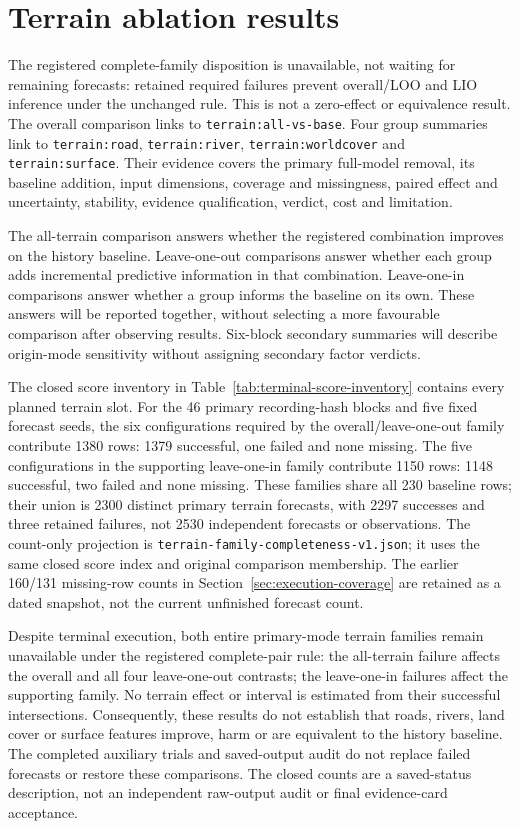 \section{Terrain ablation results}
\label{sec:terrain-results}\hypertarget{sec:terrain-results}{}
The registered complete-family disposition is unavailable, not waiting for
remaining forecasts: retained required failures prevent overall/LOO and LIO
inference under the unchanged rule. This is not a zero-effect or equivalence
result. The overall comparison links to \texttt{terrain:all-vs-base}.
Four group summaries link to \texttt{terrain:road}, \texttt{terrain:river},
\texttt{terrain:worldcover} and \texttt{terrain:surface}. Their evidence covers
the primary full-model removal, its baseline addition, input dimensions,
coverage and missingness, paired effect and uncertainty, stability, evidence
qualification, verdict, cost and limitation.

The all-terrain comparison answers whether the registered combination improves
on the history baseline. Leave-one-out comparisons answer whether each group
adds incremental predictive information in that combination. Leave-one-in
comparisons answer whether a group informs the baseline on its own. These
answers will be reported together, without selecting a more favourable
comparison after observing results. Six-block secondary summaries will
describe origin-mode sensitivity without assigning secondary factor verdicts.

The closed score inventory in Table~\ref{tab:terminal-score-inventory}
contains every planned terrain slot. For the 46 primary recording-hash
blocks and five fixed forecast seeds, the six configurations required by
the overall/leave-one-out family contribute 1380 rows: 1379 successful,
one failed and none missing. The five configurations in the supporting
leave-one-in family contribute 1150 rows: 1148 successful, two failed and
none missing. These families share all 230 baseline rows; their union is
2300 distinct primary terrain forecasts, with 2297 successes and three
retained failures, not 2530 independent forecasts or observations.
The count-only projection is \texttt{terrain-family-completeness-v1.json};
it uses the same closed score index and original comparison membership.
The earlier 160/131 missing-row counts in
Section~\ref{sec:execution-coverage} are retained as a dated snapshot,
not the current unfinished forecast count.

Despite terminal execution, both entire primary-mode terrain families
remain unavailable under the registered complete-pair rule: the
all-terrain failure affects the overall and all four leave-one-out
contrasts; the leave-one-in failures affect the supporting family.
No terrain effect or interval is estimated from their successful
intersections. Consequently, these results do not establish that roads,
rivers, land cover or surface features improve, harm or are equivalent to
the history baseline. The completed auxiliary trials and saved-output audit
do not replace failed forecasts or restore these comparisons.
The closed counts are a saved-status description, not an independent
raw-output audit or final evidence-card acceptance.

